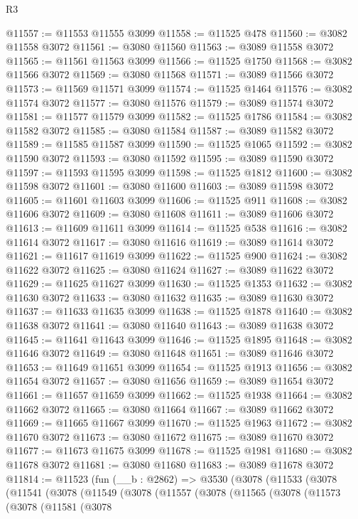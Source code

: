 \begin{lexlean}{R3}
\begin{coremodule}
@11557 := @11553 @11555 @3099
@11558 := @11525 @478
@11560 := @3082 @11558 @3072
@11561 := @3080 @11560
@11563 := @3089 @11558 @3072
@11565 := @11561 @11563 @3099
@11566 := @11525 @1750
@11568 := @3082 @11566 @3072
@11569 := @3080 @11568
@11571 := @3089 @11566 @3072
@11573 := @11569 @11571 @3099
@11574 := @11525 @1464
@11576 := @3082 @11574 @3072
@11577 := @3080 @11576
@11579 := @3089 @11574 @3072
@11581 := @11577 @11579 @3099
@11582 := @11525 @1786
@11584 := @3082 @11582 @3072
@11585 := @3080 @11584
@11587 := @3089 @11582 @3072
@11589 := @11585 @11587 @3099
@11590 := @11525 @1065
@11592 := @3082 @11590 @3072
@11593 := @3080 @11592
@11595 := @3089 @11590 @3072
@11597 := @11593 @11595 @3099
@11598 := @11525 @1812
@11600 := @3082 @11598 @3072
@11601 := @3080 @11600
@11603 := @3089 @11598 @3072
@11605 := @11601 @11603 @3099
@11606 := @11525 @911
@11608 := @3082 @11606 @3072
@11609 := @3080 @11608
@11611 := @3089 @11606 @3072
@11613 := @11609 @11611 @3099
@11614 := @11525 @538
@11616 := @3082 @11614 @3072
@11617 := @3080 @11616
@11619 := @3089 @11614 @3072
@11621 := @11617 @11619 @3099
@11622 := @11525 @900
@11624 := @3082 @11622 @3072
@11625 := @3080 @11624
@11627 := @3089 @11622 @3072
@11629 := @11625 @11627 @3099
@11630 := @11525 @1353
@11632 := @3082 @11630 @3072
@11633 := @3080 @11632
@11635 := @3089 @11630 @3072
@11637 := @11633 @11635 @3099
@11638 := @11525 @1878
@11640 := @3082 @11638 @3072
@11641 := @3080 @11640
@11643 := @3089 @11638 @3072
@11645 := @11641 @11643 @3099
@11646 := @11525 @1895
@11648 := @3082 @11646 @3072
@11649 := @3080 @11648
@11651 := @3089 @11646 @3072
@11653 := @11649 @11651 @3099
@11654 := @11525 @1913
@11656 := @3082 @11654 @3072
@11657 := @3080 @11656
@11659 := @3089 @11654 @3072
@11661 := @11657 @11659 @3099
@11662 := @11525 @1938
@11664 := @3082 @11662 @3072
@11665 := @3080 @11664
@11667 := @3089 @11662 @3072
@11669 := @11665 @11667 @3099
@11670 := @11525 @1963
@11672 := @3082 @11670 @3072
@11673 := @3080 @11672
@11675 := @3089 @11670 @3072
@11677 := @11673 @11675 @3099
@11678 := @11525 @1981
@11680 := @3082 @11678 @3072
@11681 := @3080 @11680
@11683 := @3089 @11678 @3072
@11814 := @11523
    (fun (__b : @2862) =>
    @3530
      (@3078
        (@11533
          (@3078
            (@11541
              (@3078
                (@11549
                  (@3078
                    (@11557
                      (@3078
                        (@11565
                          (@3078
                            (@11573
                              (@3078
                                (@11581
                                  (@3078

\end{coremodule}
\end{lexlean}
